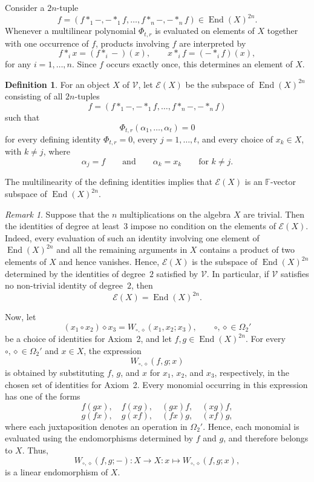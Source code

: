 \documentclass[reqno,a4paper]{amsart}
\theoremstyle{plain}
\theoremstyle{definition}
\newtheorem{definition}[subsection]{Definition}
\theoremstyle{remark}
\newtheorem{remark}[subsection]{Remark}
\numberwithin{equation}{section}
\newcommand{\F}{\mathbb{F}}
\newcommand{\E}{\mathcal{E}}
\newcommand{\V}{\mathcal{V}}
\DeclareMathOperator{\End}{End}
\begin{document}
Consider a $2n$-tuple
\[
f=
(f\ast_1-,-\ast_1 f,\ldots,f\ast_n-,-\ast_n f)
\in\End(X)^{2n}.
\]
Whenever a multilinear polynomial $\Phi_{t,r}$ is evaluated on elements of $X$ together with one occurrence of $f$, products involving $f$ are interpreted by
\[
f\ast_i x=(f\ast_i-)(x),
\qquad
x\ast_i f=(-\ast_i f)(x),
\]
for any $i=1,\ldots,n$. Since $f$ occurs exactly once, this determines an element of $X$.

\begin{definition}\label{ExternalWeakActorUnderlyingSpace}
For an object $X$ of $\V$, let $\E(X)$ be the subspace of $\End(X)^{2n}$ consisting of all $2n$-tuples
\[
f=(f\ast_1-,-\ast_1 f,\ldots,f\ast_n-,-\ast_n f)
\]
such that
\[
\Phi_{t,r}(\alpha_1,\ldots,\alpha_t)=0
\]
for every defining identity $\Phi_{t,r}=0$, every $j=1,\ldots,t$, and every choice of $x_k\in X$, with $k\neq j$, where
\[
\alpha_j=f
\qquad\text{and}\qquad
\alpha_k=x_k\qquad\text{for }k\neq j.
\]
\end{definition}

The multilinearity of the defining identities implies that $\E(X)$ is an $\F$-vector subspace of $\End(X)^{2n}$.

\begin{remark}\label{RemarkExternalActorAbelian}
Suppose that the $n$ multiplications on the algebra $X$ are trivial. Then the identities of degree at least~$3$ impose no condition on the elements of $\E(X)$. Indeed, every evaluation of such an identity involving one element of $\End(X)^{2n}$ and all the remaining arguments in $X$ contains a product of two elements of $X$ and hence vanishes. Hence, $\E(X)$ is the subspace of $\End(X)^{2n}$ determined by the identities of degree~$2$ satisfied by $\V$. In particular, if $\V$ satisfies no non-trivial identity of degree~$2$, then
\[
\E(X)=\End(X)^{2n}.
\]
\end{remark}

Now, let
\[
(x_1\circ x_2)\diamond x_3
=
W_{\circ,\diamond}(x_1,x_2;x_3),
\qquad
\circ,\diamond\in\Omega_2'
\]
be a choice of identities for Axiom~2, and let $f,g\in\End(X)^{2n}$. For every $\circ,\diamond\in\Omega_2'$ and $x\in X$, the expression
\[
W_{\circ,\diamond}(f,g;x)
\]
is obtained by substituting $f$, $g$, and $x$ for $x_1$, $x_2$, and $x_3$, respectively, in the chosen set of identities for Axiom~2. Every monomial occurring in this expression has one of the forms
\[
f(gx),\quad f(xg),\quad (gx)f,\quad (xg)f,
\]
\[
g(fx),\quad g(xf),\quad (fx)g,\quad (xf)g,
\]
where each juxtaposition denotes an operation in $\Omega_2'$. Hence, each monomial is evaluated using the endomorphisms determined by $f$ and $g$, and therefore belongs to $X$. Thus,
\[
W_{\circ,\diamond}(f,g;-)\colon
X\to X \colon
x\mapsto W_{\circ,\diamond}(f,g;x),
\]
is a linear endomorphism of $X$.
\end{document}
